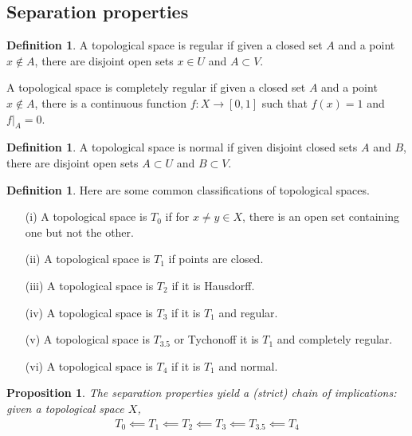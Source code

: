 \documentclass[11pt]{amsart}
\newtheorem{proposition}[theorem]{Proposition}
\theoremstyle{definition}
\newtheorem{definition}[theorem]{Definition}
\numberwithin{equation}{section}
\begin{document}
\subsection{Separation properties}
\begin{definition}
    A topological space is regular if given a closed set $A$ and a point $x\not\in A$, there are disjoint open sets $x\in U$ and $A\subset V$.

    A topological space is completely regular if given a closed set $A$ and a point $x\not\in A$, there is a continuous function $f:X\to[0,1]$ such that $f(x)=1$ and $f|_A=0$.
\end{definition}
\begin{definition}
    A topological space is normal if given disjoint closed sets $A$ and $B$, there are disjoint open sets $A\subset U$ and $B\subset V$.
\end{definition}
\begin{definition}
    Here are some common classifications of topological spaces.
    \begin{enumerate}
        \item [(i)] A topological space is $T_0$ if for $x\ne y\in X$, there is an open set containing one but not the other.
        \item [(ii)] A topological space is $T_1$ if points are closed.
        \item [(iii)] A topological space is $T_2$ if it is Hausdorff.
        \item [(iv)] A topological space is $T_3$ if it is $T_1$ and regular.
        \item [(v)] A topological space is $T_{3.5}$ or Tychonoff it is $T_1$ and completely regular.
        \item [(vi)] A topological space is $T_4$ if it is $T_1$ and normal.
    \end{enumerate}
\end{definition}
\begin{proposition}
    The separation properties yield a (strict) chain of implications: given a topological space $X$, 
    \begin{align*}
        T_0\impliedby T_1\impliedby T_2\impliedby T_3\impliedby T_{3.5}\impliedby T_4 
    \end{align*}
\end{proposition}
\end{document}
